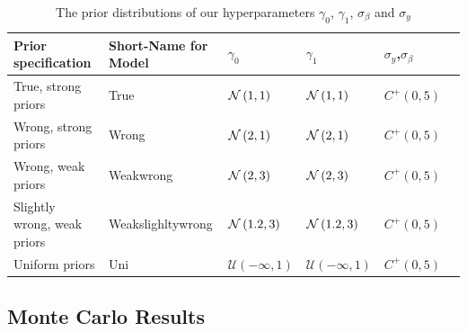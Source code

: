 \begin{table}[H]
\begin{center}
\begin{tabular}{l l l l l l}
Prior specification & Short-Name for Model & $\gamma_0$ & $\gamma_1$ & $\sigma_y$,$\sigma_\beta$\\
\hline
True, strong priors &  True & $\mathcal{N}\left(1,1\right)$ & $\mathcal{N}\left(1,1\right) $ & $C^+(0, 5)$\\
Wrong, strong priors & Wrong  &$\mathcal{N}\left(2,1\right)$ & $\mathcal{N}\left(2,1\right)$ & $C^+(0, 5)$\\
Wrong, weak priors &  Weakwrong  & $\mathcal{N}\left(2,3\right)$ &$ \mathcal{N}\left(2,3\right)$ & $C^+(0, 5)$\\
Slightly wrong, weak priors &  Weakslighltywrong & $ \mathcal{N}\left(1.2,3\right)$ &$\mathcal{N}\left(1.2,3\right)$ & $C^+(0, 5)$\\
Uniform priors & Uni &$\mathcal{U(-\infty,1)}$ & $\mathcal{U(-\infty,1)}$ & $C^+(0, 5)$\\
\end{tabular}
\end{center}
\caption{The prior distributions of our hyperparameters $\gamma_0$, $\gamma_1$, $\sigma_\beta$ and  $\sigma_y$}
\label{tab:prior_table}
\end{table}


\subsection{Monte Carlo Results}

